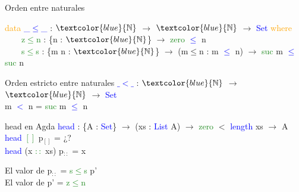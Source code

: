 \documentclass[xcolor=dvipsnames]{beamer} %
\newcommand{\cf}[1]{\textcolor{blue}{#1}}
\newcommand{\ct}[1]{\textcolor{blue}{#1}}
\newcommand{\cc}[1]{\textcolor{ForestGreen}{#1}}
\newcommand{\ck}[1]{\textcolor{orange}{#1}}
\newcommand{\N}{\ct{\mathbb{N}}}
\newcommand{\ra}{\rightarrow}
\begin{document}
\begin{frame}

\begin{block}{Orden entre naturales}

\ck{data} \ct{\_$\leq$\_} : $\N$ $\ra$ $\N$ $\ra$ \ct{Set} \ck{where}\\
\ \ \ \ \cc{z$\leq$n} : \{n : $\N$\}                 $\ra$ \cc{zero}  \ct{$\leq$} n\\
\ \ \ \ \cc{s$\leq$s} : \{m n : $\N$\} $\ra$ (m$\leq$n : m \ct{$\leq$} n) $\ra$ \cc{suc} m \ct{$\leq$} \cc{suc} n

\end{block}

\begin{block}{Orden estricto entre naturales}
\cf{$\_<\_$} : $\N$ $\ra$ $\N$ $\ra$ \ct{Set}\\
m \cf{$<$} n = \cc{suc} m \cf{$\leq$} n
\end{block}

\begin{block}{head en Agda}
    \cf{head} : \{A : \ct{Set}\}  $\ra$ (xs : \ct{List} A) $\ra$ 
    \cc{zero} $<$ \ct{length} xs $\rightarrow$ A \\
    \cf{head} \cc{$[]$} p$_{[]}$ = ¿?\\
    \cf{head} (x \cc{$::$} xs) p$_{::}$ = x
  \end{block}  

\begin{block}{}
El valor de p$_{::}$ = \cc{s$\leq$s} p'\\
El valor de p' = \cc{z$\leq$n}
\end{block}

\end{frame}
\end{document}
